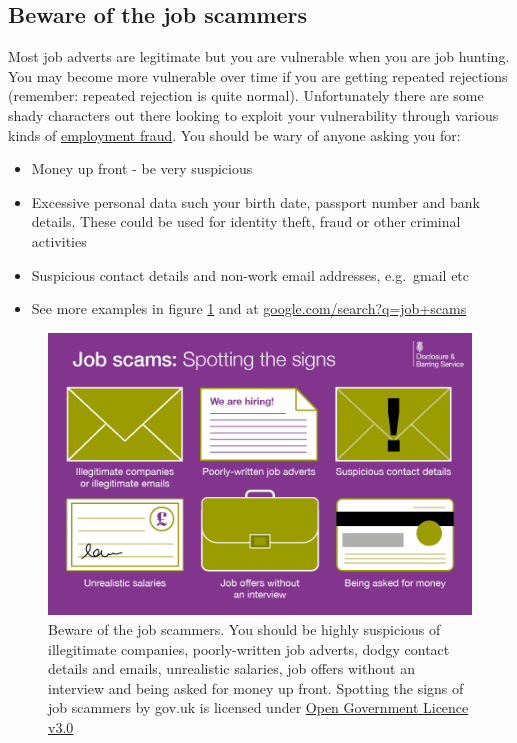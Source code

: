 \documentclass[
]{book}
\providecommand{\tightlist}{%
  \setlength{\itemsep}{0pt}\setlength{\parskip}{0pt}}
\begin{document}
\hypertarget{scams}{%
\subsection{Beware of the job scammers}\label{scams}}

Most job adverts are legitimate but you are vulnerable when you are job hunting. You may become more vulnerable over time if you are getting repeated rejections (remember: repeated rejection is quite normal). Unfortunately there are some shady characters out there looking to exploit your vulnerability through various kinds of \href{https://en.wikipedia.org/wiki/Employment_fraud}{employment fraud}. \citep{jobscammers} You should be wary of anyone asking you for:

\begin{itemize}
\tightlist
\item
  Money up front - be very suspicious
\item
  Excessive personal data such your birth date, passport number and bank details. These could be used for identity theft, fraud or other criminal activities
\item
  Suspicious contact details and non-work email addresses, e.g.~gmail etc \citep{jobscammers2}
\item
  See more examples in figure \ref{fig:jobscams-fig} and at \href{https://www.google.com/search?q=job+scams}{google.com/search?q=job+scams}
\end{itemize}

\begin{figure}

{\centering \includegraphics[width=0.98\linewidth]{images/Job-Scams-Signs-GOVUK} 

}

\caption{Beware of the job scammers. You should be highly suspicious of illegitimate companies, poorly-written job adverts, dodgy contact details and emails, unrealistic salaries, job offers without an interview and being asked for money up front. Spotting the signs of job scammers by gov.uk is licensed under \href{https://www.nationalarchives.gov.uk/doc/open-government-licence/version/3/}{Open Government Licence v3.0} \citep{jobscammers2}}\label{fig:jobscams-fig}
\end{figure}
\end{document}
